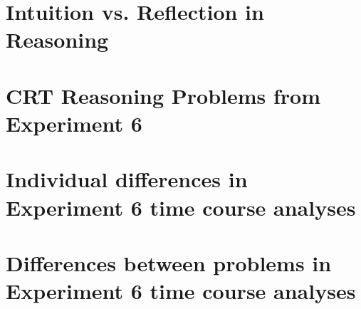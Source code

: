 \documentclass{../Dissertate}
\begin{document}
\doublespacing

\setcounter{chapter}{5}
\chapter{Intuition vs. Reflection in Reasoning}






\begin{appendices}
  \appendixpage
  \graphicspath{{./../Appendices/}}

  \chapter{CRT Reasoning Problems from Experiment 6}\label{appendix:exp6_stimuli}
  

  \chapter{Individual differences in Experiment 6 time course analyses}
  \label{appendix:exp6_participants}
  

  \chapter{Differences between problems in Experiment 6 time course analyses}
  \label{appendix:exp6_items}
  

\end{appendices}



\end{document}
